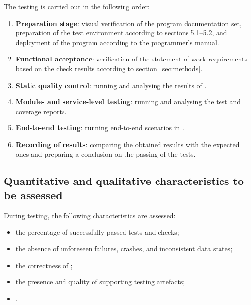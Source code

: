 \documentclass[12pt,a4paper]{extarticle}
\begin{document}
\begin{hseExample}
The testing is carried out in the following order:

\begin{enumerate}[label=\arabic*), leftmargin=1.25cm]
    \item \textbf{Preparation stage}: visual verification of the program documentation set, preparation of the test environment according to sections 5.1--5.2, and deployment of the program according to the programmer's manual.
    \item \textbf{Functional acceptance}: verification of the statement of work requirements based on the check results according to section~\ref{sec:methods}.
    \item \textbf{Static quality control}: running and analysing the results of .
    \item \textbf{Module- and service-level testing}: running  and analysing the test and coverage reports.
    \item \textbf{End-to-end testing}: running end-to-end scenarios in .
    \item \textbf{Recording of results}: comparing the obtained results with the expected ones and preparing a conclusion on the passing of the tests.
\end{enumerate}
\end{hseExample}

\subsection{Quantitative and qualitative characteristics to be assessed}

\begin{hseExample}
During testing, the following characteristics are assessed:

\begin{itemize}[leftmargin=1.25cm]
    \item the percentage of successfully passed tests and checks;
    \item the absence of unforeseen failures, crashes, and inconsistent data states;
    \item the correctness of ;
    \item the presence and quality of supporting testing artefacts;
    \item {}.
\end{itemize}
\end{hseExample}
\end{document}

